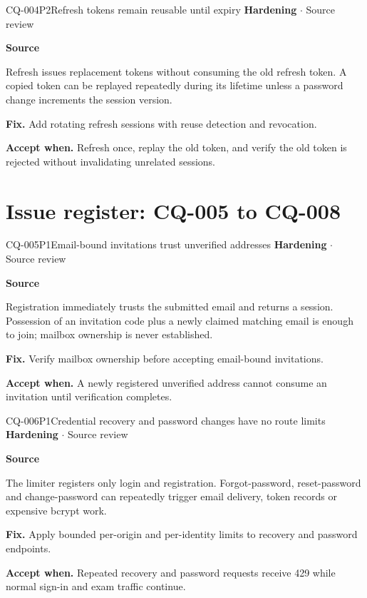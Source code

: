 \begin{finding}{CQ-004}{P2}{Refresh tokens remain reusable until expiry}
\textbf{Hardening} $\cdot$ Source review\par
\textbf{Source}\quad{}\par
Refresh issues replacement tokens without consuming the old refresh token. A copied token can be replayed repeatedly during its lifetime unless a password change increments the session version.\par
\textbf{Fix.} Add rotating refresh sessions with reuse detection and revocation.\par
\textbf{Accept when.} Refresh once, replay the old token, and verify the old token is rejected without invalidating unrelated sessions.
\end{finding}
\clearpage
\section*{Issue register: CQ-005 to CQ-008}
\begin{finding}{CQ-005}{P1}{Email-bound invitations trust unverified addresses}
\textbf{Hardening} $\cdot$ Source review\par
\textbf{Source}\quad{}\par
Registration immediately trusts the submitted email and returns a session. Possession of an invitation code plus a newly claimed matching email is enough to join; mailbox ownership is never established.\par
\textbf{Fix.} Verify mailbox ownership before accepting email-bound invitations.\par
\textbf{Accept when.} A newly registered unverified address cannot consume an invitation until verification completes.
\end{finding}
\begin{finding}{CQ-006}{P1}{Credential recovery and password changes have no route limits}
\textbf{Hardening} $\cdot$ Source review\par
\textbf{Source}\quad{}\par
The limiter registers only login and registration. Forgot-password, reset-password and change-password can repeatedly trigger email delivery, token records or expensive bcrypt work.\par
\textbf{Fix.} Apply bounded per-origin and per-identity limits to recovery and password endpoints.\par
\textbf{Accept when.} Repeated recovery and password requests receive 429 while normal sign-in and exam traffic continue.
\end{finding}
